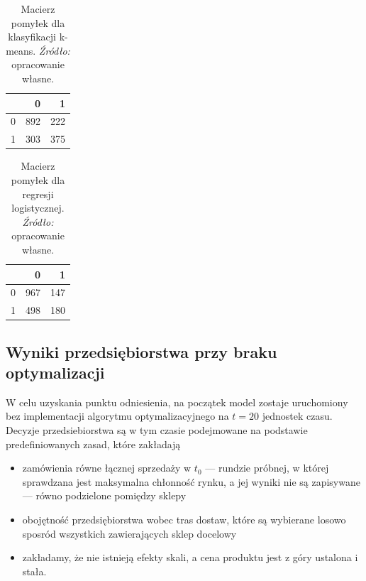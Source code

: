\documentclass[polish, twoside, 12pt, a4paper]{article}
\theoremstyle{definition}
\theoremstyle{plain}
\theoremstyle{remark}
\begin{document}
\begin{table}[hbt]
  \centering

  \captionsetup{margin=10pt,font=small,labelfont=bf,width=.8\textwidth}

  \caption[Przykład prostej tablicy]{Macierz pomyłek dla klasyfikacji k-means. \textit{Źródło:} opracowanie własne.}
  \label{tab:exceptional-table}

\vspace*{2ex}
\begin{tabular}{rrr}
  \hline
 & 0 & 1 \\ 
  \hline
0 & 892 & 222 \\ 
  1 & 303 & 375 \\ 
   \hline
\end{tabular}
\end{table}


\begin{table}[hbt]
  \centering

  \captionsetup{margin=10pt,font=small,labelfont=bf,width=.8\textwidth}

  \caption[Przykład prostej tablicy]{Macierz pomyłek dla regresji logistycznej. \textit{Źródło:} opracowanie własne.}
  \label{tab:exceptional-table}

\vspace*{2ex}
\begin{tabular}{rrr}
  \hline
 & 0 & 1 \\ 
  \hline
0 & 967 & 147 \\ 
  1 & 498 & 180 \\ 
   \hline
\end{tabular}
\end{table}



\subsection{Wyniki przedsiębiorstwa przy braku optymalizacji}

W celu uzyskania punktu odniesienia, na początek model zostaje uruchomiony bez implementacji algorytmu optymalizacyjnego na $t=20$ jednostek czasu. Decyzje przedsiebiorstwa są w tym czasie podejmowane na podstawie predefiniowanych zasad, które zakładają 

	\begin{itemize}
		\item zamówienia równe łącznej sprzedaży w $t_0$ --- rundzie próbnej, w której sprawdzana jest maksymalna chłonność rynku, a jej wyniki nie są zapisywane --- równo podzielone pomiędzy sklepy
		\item obojętność przedsiębiorstwa wobec tras dostaw, które są wybierane losowo sposród wszystkich zawierających sklep docelowy
		\item zakładamy, że nie istnieją efekty skali, a cena produktu jest z góry ustalona i stała. 
	\end{itemize}
\end{document}
